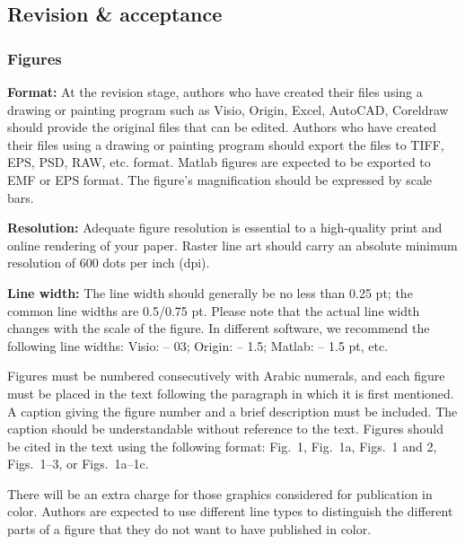 \documentclass[twoside,twocolumn]{article}
\begin{document}
\subsection{Revision \& acceptance}

\subsubsection{Figures}\label{sec:figure}

\noindent \textbf{Format:} At the revision stage, authors who have created their files using a drawing or painting program such as Visio, Origin, Excel, AutoCAD, Coreldraw should provide the original files that can be edited. Authors who have created their files using a drawing or painting program should export the files to TIFF, EPS, PSD, RAW, etc. format. Matlab figures are expected to be exported to EMF or EPS format. The figure's magnification should be expressed by scale bars.

\noindent \textbf{Resolution:} Adequate figure resolution is essential to a high-quality print and online rendering of your paper. Raster line art should carry an absolute minimum resolution of 600 dots per inch (dpi).

\noindent \textbf{Line width:} The line width should generally be no less than 0.25 pt; the common line widths are 0.5/0.75 pt. Please note that the actual line width changes with the scale of the figure. In different software, we recommend the following line widths: Visio: -- 03; Origin: -- 1.5; Matlab: -- 1.5 pt, etc.

Figures must be numbered consecutively with Arabic numerals, and each figure must be placed in the text following the paragraph in which it is first mentioned. A caption giving the figure number and a brief description must be included. The caption should be understandable without reference to the text. Figures should be cited in the text using the following format: Fig.~1, Fig.~1a, Figs.~1 and 2, Figs.~1--3, or Figs.~1a--1c.

There will be an extra charge for those graphics considered for publication in color. Authors are expected to use different line types to distinguish the different parts of a figure that they do not want to have published in color.
\end{document}

